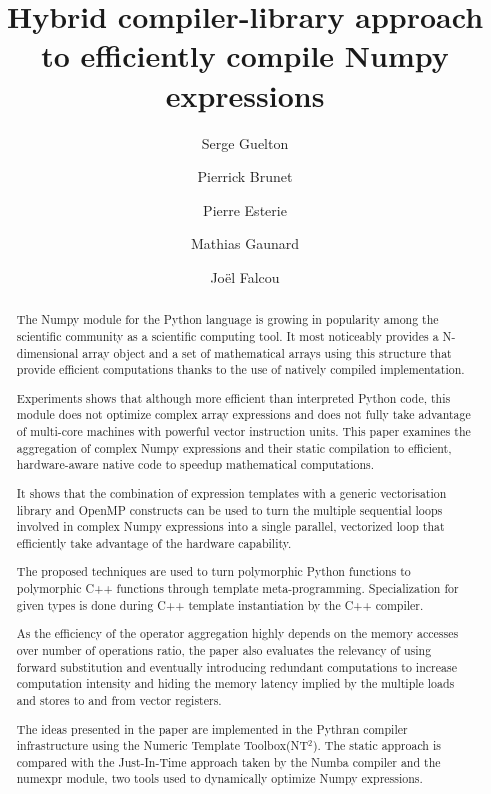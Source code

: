 \documentclass{llncs}
\begin{document}
\title{Hybrid compiler-library approach to efficiently compile Numpy expressions}

\author{Serge Guelton \and Pierrick Brunet \and Pierre Esterie\\
 \and Mathias Gaunard \and Joël Falcou }

\maketitle

\begin{abstract}

    The Numpy module for the Python language is growing in popularity among the
    scientific community as a scientific computing tool. It most noticeably
    provides a N-dimensional array object and a set of mathematical arrays
    using this structure that provide efficient computations thanks to the use
    of natively compiled implementation.

    Experiments shows that although more efficient than interpreted Python code,
    this module does not optimize complex array expressions and does not fully
    take advantage of multi-core machines with powerful vector instruction
    units. This paper examines the aggregation of complex Numpy expressions and
    their static compilation to efficient, hardware-aware native code to
    speedup mathematical computations.

    It shows that the combination of expression templates with a generic
    vectorisation library and OpenMP constructs can be used to turn the
    multiple sequential loops involved in complex Numpy expressions into a
    single parallel, vectorized loop that efficiently take advantage of the
    hardware capability.
    
    The proposed techniques are used to turn polymorphic Python functions to
    polymorphic C++ functions through template meta-programming. Specialization
    for given types is done during C++ template instantiation by the C++
    compiler.
    
    As the efficiency of the operator aggregation highly depends on the memory
    accesses over number of operations ratio, the paper also evaluates the
    relevancy of using forward substitution and eventually introducing
    redundant computations to increase computation intensity and hiding the
    memory latency implied by the multiple loads and stores to and from vector
    registers.

    The ideas presented in the paper are implemented in the Pythran compiler
    infrastructure using the Numeric Template Toolbox(NT$^2$). The static
    approach is compared with the Just-In-Time approach taken by the Numba
    compiler and the numexpr module, two tools used to dynamically optimize
    Numpy expressions. 

\end{abstract}

%
%
\end{document}
